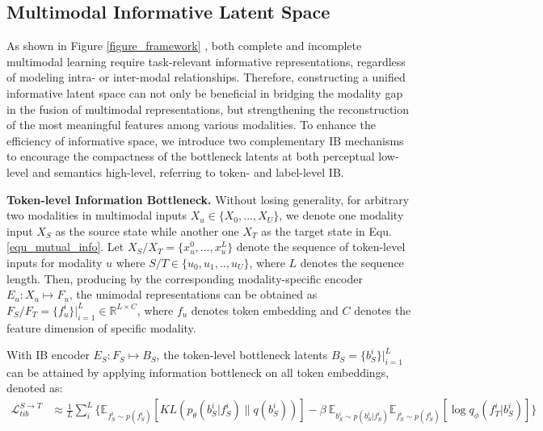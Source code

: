 \documentclass{article}
\begin{document}
\subsection{Multimodal Informative Latent Space}
As shown in Figure \ref{figure_framework} , both complete and incomplete multimodal learning require task-relevant informative representations, regardless of modeling intra- or inter-modal relationships. Therefore, constructing a unified informative latent space can not only be beneficial in bridging the modality gap in the fusion of multimodal representations, but strengthening the reconstruction of the most meaningful features among various modalities. To enhance the efficiency of informative space, we introduce two complementary IB mechanisms to encourage the compactness of the bottleneck latents at both perceptual low-level and semantics high-level, referring to token- and label-level IB.

\textbf{Token-level Information Bottleneck.} Without losing generality, for arbitrary two modalities in multimodal inputs $X_u\in\{X_0,...,X_U\}$, we denote one modality input $X_S$ as the source state while another one $X_T$ as the target state in Equ. \ref{equ_mutual_info}. Let $X_S/X_T=\{x_u^0, ... ,x_u^{L}\}$ denote the sequence of token-level inputs for modality $u$ where $S/T\in\{u_0,u_1,..,u_U\}$, where $L$ denotes the sequence length. Then, producing by the corresponding modality-specific encoder $E_u:X_u\mapsto F_u$, the unimodal representations can be obtained as $F_S/F_T=\{f_u^i\}|_{i=1}^{L}\in\mathbb{R}^{L\times C}$, where $f_u$ denotes token embedding and $C$ denotes the feature dimension of specific modality.

With IB encoder $E_S:F_S\mapsto B_S$, the token-level bottleneck latents $B_S=\{b_S^i\}|_{i=1}^{L}$ can be attained by applying information bottleneck on all token embeddings, denoted as:
\begin{equation}
\begin{aligned}
    \mathcal{L}^{S\rightarrow T}_{tib} 
    &\approx \frac{1}{L}\sum^L_{i} \{\mathbb{E}_{f^i_S\sim p(f^i_S)} \left[KL( p_\theta(b^i_S|f^i_S)\parallel q(b^i_S))\right] - \beta\ \mathbb{E}_{b^i_S\sim p(b^i_S|f^i_S)}\mathbb{E}_{f^i_S\sim p(f^i_S)} [\log q_\phi(f^i_T|b^i_S)] \}
\label{equ_token_ib1}
\end{aligned}
\end{equation}
\end{document}

